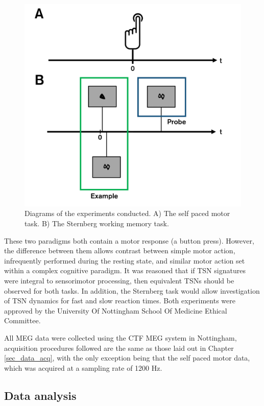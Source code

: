 \begin{figure}[b!]
\begin{center}
\includegraphics[width=0.8\linewidth]{./images/chapter5/Figure_0.png}\caption{Diagrams of the experiments conducted. A) The self paced motor task. B) The Sternberg working memory task.}\label{figure_5_0}
\end{center}
\end{figure}

These two paradigms both contain a motor response (a button press). However, the difference between them allows contrast between simple motor action, infrequently performed during the resting state, and similar motor action set within a complex cognitive paradigm. It was reasoned that if TSN signatures were integral to sensorimotor processing, then equivalent TSNs should be observed for both tasks. In addition, the Sternberg task would allow investigation of TSN dynamics for fast and slow reaction times. Both experiments were approved by the University Of Nottingham School Of Medicine Ethical Committee. 

All MEG data were collected using the CTF MEG system in Nottingham, acquisition procedures followed are the same as those laid out in Chapter \ref{sec_data_acq}, with the only exception being that the self paced motor data, which was acquired at a sampling rate of 1200 Hz. 

\subsection{Data analysis}

